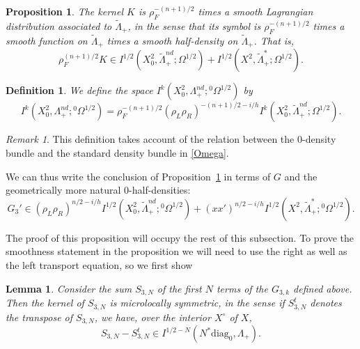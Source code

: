 \documentclass[10pt, a4paper, twoside]{amsart}
\numberwithin{equation}{section}
\newtheorem{lemma}[theorem]{Lemma}
\newtheorem{proposition}[theorem]{Proposition}
\newtheorem{definition}[theorem]{Definition}
\theoremstyle{remark}
\newtheorem{remark}[theorem]{Remark}
\begin{document}
\begin{proposition}\label{prop:K} The kernel $K$ is $\rho_F^{-(n+1)/2}$ times a smooth Lagrangian distribution associated to ${\tilde \Lambda}_+$, in the sense that its symbol is $\rho_F^{-(n+1)/2}$ times a smooth function on ${\tilde \Lambda}_+$ times a smooth half-density on ${\tilde \Lambda}_+$. That is, 
$$
\rho_F^{(n+1)/2} K \in  I^{1/2}(X^2_0, {\tilde \Lambda}_+^{nd}; \Omega^{1/2}) + I^{1/2}(X^2, {\tilde \Lambda}_+^*; \Omega^{1/2}). 
$$
\end{proposition}

\begin{definition}
We define the space $I^{k}(X^2_0, \Lambda_+^{nd}; {{}^0\Omega^{1/2}})$ by
$$
I^{k}(X^2_0, \Lambda_+^{nd}; {{}^0\Omega^{1/2}}) = \rho_F^{-(n+1)/2} (\rho_L \rho_R)^{-(n+1)/2-i/h} I^{k}(X^2_0, {\tilde \Lambda}_+^{nd}; \Omega^{1/2}).
$$
\end{definition}

\begin{remark} This definition takes account of the relation between the $0$-density bundle and the standard density bundle in \eqref{Omega}. 
\end{remark}

We can thus write the conclusion of Proposition~\ref{prop:K} in terms of $G$ and the geometrically more natural 0-half-densities:  
\begin{equation}
G_3' \in (\rho_L \rho_R)^{n/2-i/h} I^{1/2}(X^2_0, {\tilde \Lambda}_+^{nd}; {{}^0\Omega^{1/2}}) + (xx')^{n/2 - i/h} I^{1/2}(X^2, {\tilde \Lambda}_+^*; {{}^0\Omega^{1/2}}).
\end{equation}

The proof of this proposition will occupy the rest of this subsection. 
To prove the smoothness statement in the proposition we will  need to use the right as well as the left transport equation, so we first show

\begin{lemma}\label{lem:symm}
Consider the sum $S_{3, N}$ of the first $N$ terms of the $G_{3, k}$ defined above. Then the kernel of $S_{3, N}$ is microlocally symmetric, in the sense if $S^t_{3, N}$ denotes the transpose of $S_{3, N}$, we have, over the interior $X^\circ$ of $X$, 
$$
S_{3, N} - S^t_{3, N} \in I^{1/2 - N}(N^* {\mathrm{diag}_0}, \Lambda_+).
$$
\end{lemma}
\end{document}
